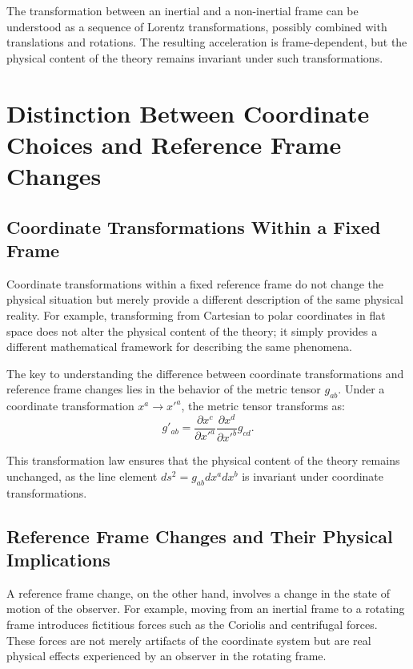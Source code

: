 \documentclass[12pt]{article}
\begin{document}
The transformation between an inertial and a non-inertial frame can be understood as a sequence of Lorentz transformations, possibly combined with translations and rotations. The resulting acceleration is frame-dependent, but the physical content of the theory remains invariant under such transformations.

\section{Distinction Between Coordinate Choices and Reference Frame Changes}
\subsection{Coordinate Transformations Within a Fixed Frame}
Coordinate transformations within a fixed reference frame do not change the physical situation but merely provide a different description of the same physical reality. For example, transforming from Cartesian to polar coordinates in flat space does not alter the physical content of the theory; it simply provides a different mathematical framework for describing the same phenomena.

The key to understanding the difference between coordinate transformations and reference frame changes lies in the behavior of the metric tensor \( g_{ab} \). Under a coordinate transformation \( x^a \rightarrow x'^a \), the metric tensor transforms as:
\begin{equation}
g'_{ab} = \frac{\partial x^c}{\partial x'^a} \frac{\partial x^d}{\partial x'^b} g_{cd}.
\end{equation}

This transformation law ensures that the physical content of the theory remains unchanged, as the line element \( ds^2 = g_{ab} dx^a dx^b \) is invariant under coordinate transformations.

\subsection{Reference Frame Changes and Their Physical Implications}
A reference frame change, on the other hand, involves a change in the state of motion of the observer. For example, moving from an inertial frame to a rotating frame introduces fictitious forces such as the Coriolis and centrifugal forces. These forces are not merely artifacts of the coordinate system but are real physical effects experienced by an observer in the rotating frame.
\end{document}
